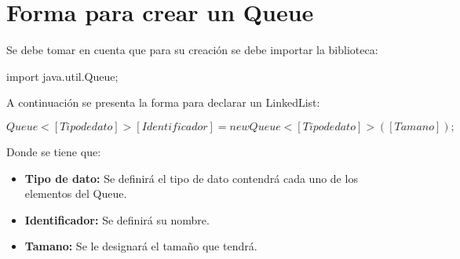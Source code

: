 \documentclass[12pt, letterpaper]{article} %
\begin{document}
\section*{Forma para crear un Queue}
Se debe tomar en cuenta que para su creación se debe importar la biblioteca:
\begin{center}
    import java.util.Queue;
\end{center}
A continuación se presenta la forma para declarar un LinkedList:
\begin{center}
    $Queue<[Tipo de dato]> [Identificador] = new Queue<[Tipo de dato]>([Tamano]);$
\end{center}
Donde se tiene que:
\begin{itemize}
    \item \textbf{Tipo de dato:} Se definirá el tipo de dato contendrá cada uno de los elementos del Queue.
    \item \textbf{Identificador:} Se definirá su nombre.
    \item \textbf{Tamano:} Se le designará el tamaño que tendrá.
\end{itemize}
\end{document}

